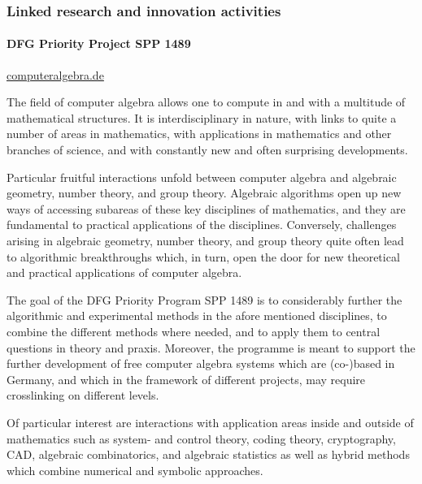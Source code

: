 \documentclass[a4paper,11pt]{article}
\begin{document}
\subsubsection{Linked research and innovation activities}



\paragraph{DFG Priority Project SPP 1489}
\url{computeralgebra.de}


The field of computer algebra allows one to compute in and with a
multitude of mathematical structures. It is interdisciplinary in
nature, with links to quite a number of areas in mathematics, with
applications in mathematics and other branches of science, and with
constantly new and often surprising developments.

Particular fruitful interactions unfold between computer algebra and
algebraic geometry, number theory, and group theory. Algebraic
algorithms open up new ways of accessing subareas of these key
disciplines of mathematics, and they are fundamental to practical
applications of the disciplines. Conversely, challenges arising in
algebraic geometry, number theory, and group theory quite often lead
to algorithmic breakthroughs which, in turn, open the door for new
theoretical and practical applications of computer algebra.

The goal of the DFG Priority Program SPP 1489 is to considerably
further the algorithmic and experimental methods in the afore
mentioned disciplines, to combine the different methods where needed,
and to apply them to central questions in theory and praxis. Moreover,
the programme is meant to support the further development of free
computer algebra systems which are (co-)based in Germany, and which in
the framework of different projects, may require crosslinking on
different levels.

Of particular interest are interactions with application areas inside
and outside of mathematics such as system- and control theory, coding
theory, cryptography, CAD, algebraic combinatorics, and algebraic
statistics as well as hybrid methods which combine numerical and
symbolic approaches.
\end{document}
